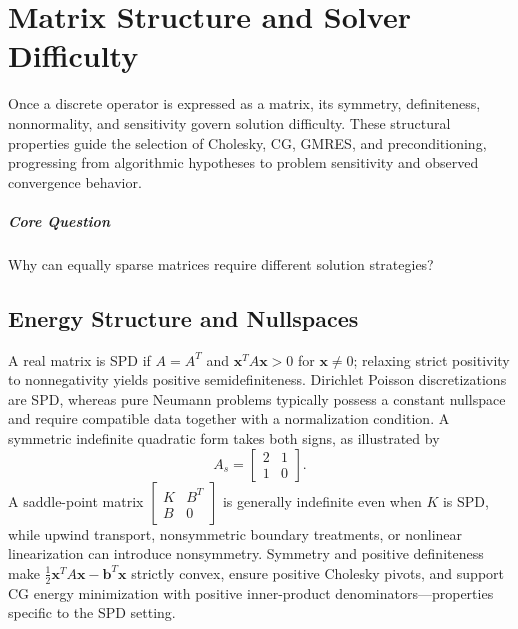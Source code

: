 \chapter{Matrix Structure and Solver Difficulty}\label{v0ch:2}
\begin{chaptersummary}
Once a discrete operator is expressed as a matrix, its symmetry, definiteness, nonnormality, and sensitivity govern solution difficulty. These structural properties guide the selection of Cholesky, CG, GMRES, and preconditioning, progressing from algorithmic hypotheses to problem sensitivity and observed convergence behavior.
\end{chaptersummary}
\paragraph{Core Question}Why can equally sparse matrices require different solution strategies?

\section{Energy Structure and Nullspaces}
A real matrix is SPD if $A=A^T$ and $\bm x^TA\bm x>0$ for $\bm x\ne0$; relaxing strict positivity to nonnegativity yields positive semidefiniteness. Dirichlet Poisson discretizations are SPD, whereas pure Neumann problems typically possess a constant nullspace and require compatible data together with a normalization condition. A symmetric indefinite quadratic form takes both signs, as illustrated by
\[
 A_s=\begin{bmatrix}2&1\\1&0\end{bmatrix}.
\]
A saddle-point matrix $\left[\begin{smallmatrix}K&B^T\\B&0\end{smallmatrix}\right]$ is generally indefinite even when $K$ is SPD, while upwind transport, nonsymmetric boundary treatments, or nonlinear linearization can introduce nonsymmetry. Symmetry and positive definiteness make $\frac12\bm x^TA\bm x-\bm b^T\bm x$ strictly convex, ensure positive Cholesky pivots, and support CG energy minimization with positive inner-product denominators—properties specific to the SPD setting.
